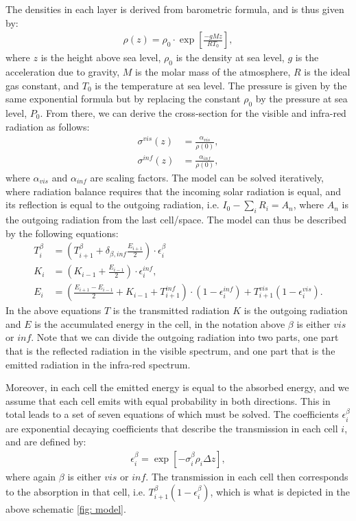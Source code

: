 \documentclass[a4paper]{article}
\newcommand{\newparagraph}{\vspace{.5cm}\noindent}
\begin{document}
The densities in each layer is derived from barometric formula, and is thus given by:
\begin{align}
    \rho(z) = \rho_0\cdot\exp\left[\frac{-gMz}{RT_0}\right],\label{eq: density}
\end{align}where $z$ is the height above sea level, $\rho_0$ is the density at sea level, $g$ is the acceleration due to gravity, $M$ is the molar mass of the atmosphere, $R$ is the ideal gas constant, and $T_0$ is the temperature at sea level.
The pressure is given by the same exponential formula but by replacing the constant $\rho_0$ by the pressure at sea level, $P_0$.
From there, we can derive the cross-section for the visible and infra-red radiation as follows:
\begin{align*}
    \sigma^{vis}(z) &= \frac{\alpha_{vis}}{\rho(0)},\\
    \sigma^{inf}(z) &= \frac{\alpha_{inf}}{\rho(0)},
\end{align*}where $\alpha_{vis}$ and $\alpha_{inf}$ are scaling factors.
The model can be solved iteratively, where radiation balance requires that the incoming solar radiation is equal, and its reflection is equal to the outgoing radiation, i.e. $I_0 - \sum_i R_i = A_n$, where $A_n$ is the outgoing radiation from the last cell/space.
The model can thus be described by the following equations:
\begin{align}
    T_i^{\beta} &= \left(T_{i + 1}^{\beta} + \delta_{\beta, inf}\frac{E_{i+1}}{2}\right) \cdot \epsilon_{i}^{\beta}\label{eq: in}\\
    K_i &= \left(K_{i - 1} + \frac{E_{i - 1}}{2}\right)\cdot\epsilon_i^{inf},\label{eq: out}\\
    E_i &= \left(\frac{E_{i + 1} - E_{i - 1}}{2} + K_{i - 1} + T_{i + 1}^{inf}\right)\cdot\left(1 - \epsilon_i^{inf}\right)+T_{i+1}^{vis}\left(1 - \epsilon_i^{vis}\right).\label{eq: energy}
\end{align}In the above equations $T$ is the transmitted radiation $K$ is the outgoing radiation and $E$ is the accumulated energy in the cell, in the notation above $\beta$ is either $vis$ or $inf$.
Note that we can divide the outgoing radiation into two parts, one part that is the reflected radiation in the visible spectrum, and one part that is the emitted radiation in the infra-red spectrum.

\newparagraph
Moreover, in each cell the emitted energy is equal to the absorbed energy, and we assume that each cell emits with equal probability in both directions. This in total leads to a set of seven equations of which must be solved.
The coefficients $\epsilon_i^{\beta}$ are exponential decaying coefficients that describe the transmission in each cell $i$, and are defined by:
\begin{align*}
    \epsilon_i^\beta = \exp\left[-\sigma_i^\beta\rho_i\Delta z\right],
\end{align*}where again $\beta$ is either $vis$ or $inf$. The transmission in each cell then corresponds to the absorption in that cell, i.e. $T_{i+1}^{\beta}(1 - \epsilon_i^{\beta})$, which is what is depicted in the above schematic \ref{fig: model}.
\end{document}
